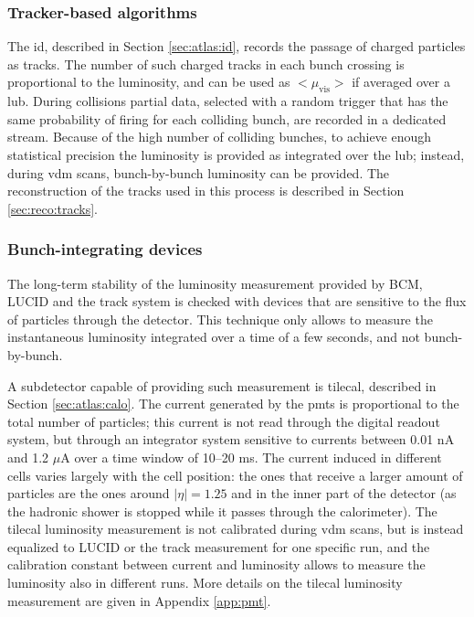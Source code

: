 
\subsubsection*{Tracker-based algorithms}

The \gls{id}, described in Section \ref{sec:atlas:id}, records the passage of charged particles as tracks. The number of such charged tracks in each bunch crossing is proportional to the luminosity, and can be used as $<\mu_\mathrm{vis}>$ if averaged over a \gls{lub}. 
During collisions partial data, selected with a random trigger that has the same probability of firing for each colliding bunch, are recorded in a dedicated stream. Because of the high number of colliding bunches, to achieve enough statistical precision the luminosity is provided as integrated over the \gls{lub}; instead, during \gls{vdm} scans, bunch-by-bunch luminosity can be provided. 
The reconstruction of the tracks used in this process is described in Section \ref{sec:reco:tracks}.

\subsubsection*{Bunch-integrating devices}

The long-term stability of the luminosity measurement provided by BCM, LUCID and the track system is checked with devices that are sensitive to the flux of particles through the detector. This technique only allows to measure the instantaneous luminosity integrated over a time of a few seconds, and not bunch-by-bunch.

A subdetector capable of providing such measurement is \gls{tilecal}, described in Section \ref{sec:atlas:calo}. The current generated by the \glspl{pmt} is proportional to the total number of particles; this current is not read through the digital readout system, but through an integrator system sensitive to currents between 0.01 nA and 1.2 $\mu$A over a time window of 10--20 ms. The current induced in different cells varies largely with the cell position: the ones that receive a larger amount of particles are the ones around $|\eta|=1.25$ and in the inner part of the detector (as the hadronic shower is stopped while it passes through the calorimeter). The \gls{tilecal} luminosity measurement is not calibrated during \gls{vdm} scans, but is instead equalized to LUCID or the track measurement for one specific run, and the calibration constant between current and luminosity allows to measure the luminosity also in different runs. More details on the \gls{tilecal} luminosity measurement are given in 
Appendix \ref{app:pmt}. 

